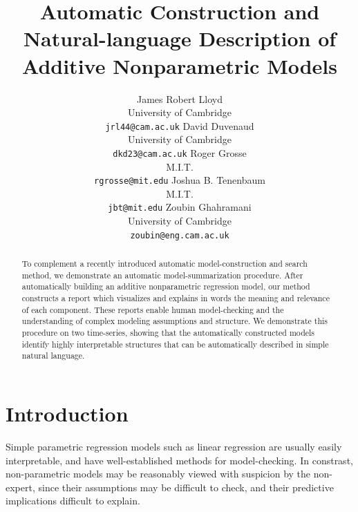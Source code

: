 \documentclass{article} %
\title{Automatic Construction and Natural-language Description of Additive Nonparametric Models}
\author{
James Robert Lloyd\\
University of Cambridge\\
\texttt{jrl44@cam.ac.uk}
\And
David Duvenaud\\
University of Cambridge \\
\texttt{dkd23@cam.ac.uk}
\And
Roger Grosse\\
M.I.T.\\
\texttt{rgrosse@mit.edu}
\And
Joshua B. Tenenbaum\\
M.I.T.\\
\texttt{jbt@mit.edu}
\And
Zoubin Ghahramani\\
University of Cambridge \\
\texttt{zoubin@eng.cam.ac.uk}
}
\begin{document}
\allowdisplaybreaks

\maketitle

\begin{abstract}
To complement a recently introduced automatic model-construction and search method, we demonstrate an automatic model-summarization procedure.
After automatically building an additive nonparametric regression model, our method constructs a report which visualizes and explains in words the meaning and relevance of each component.
These reports enable human model-checking and the understanding of complex modeling assumptions and structure.
We demonstrate this procedure on two time-series, showing that the automatically constructed models identify highly interpretable structures that can be automatically described in simple natural language.
\end{abstract}

\section{Introduction}
\vspace{-0.08in}


Simple parametric regression models such as linear regression are usually easily interpretable, and have well-established methods for model-checking.
In constrast, non-parametric models may be reasonably viewed with suspicion by the non-expert, since their assumptions may be difficult to check, and their predictive implications difficult to explain.

\end{document}
